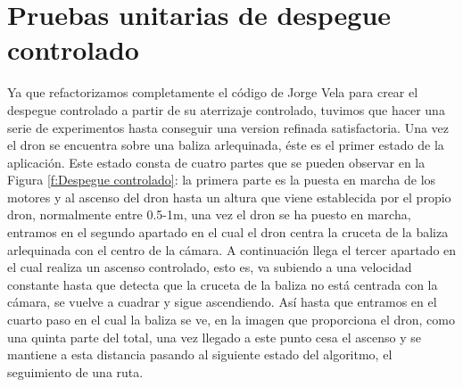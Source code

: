\section{Pruebas unitarias de despegue controlado}
\hspace{1cm} Ya que refactorizamos completamente el código de Jorge Vela para crear el despegue controlado a partir de su aterrizaje controlado, tuvimos que hacer una serie de experimentos hasta conseguir una version refinada satisfactoria. Una vez el dron se encuentra sobre una baliza arlequinada, éste es el primer estado de la aplicación. Este estado consta de cuatro partes que se pueden observar en la Figura \ref{f:Despegue controlado}: la primera parte es la puesta en marcha de los motores y al ascenso del dron hasta un altura que viene establecida por el propio dron, normalmente entre 0.5-1m, una vez el dron se ha puesto en marcha, entramos en el segundo apartado en el cual el dron centra la cruceta de la baliza arlequinada con el centro de la cámara. A continuación llega el tercer apartado en el cual realiza un ascenso controlado, esto es, va subiendo a una velocidad constante hasta que detecta que la cruceta de la baliza no está centrada con la cámara, se vuelve a cuadrar y sigue ascendiendo. Así hasta que entramos en el cuarto paso en el cual la baliza se ve, en la imagen que proporciona el dron, como una quinta parte del total, una vez llegado a este punto cesa el ascenso y se mantiene a esta distancia pasando al siguiente estado del algoritmo, el seguimiento de una ruta. 

